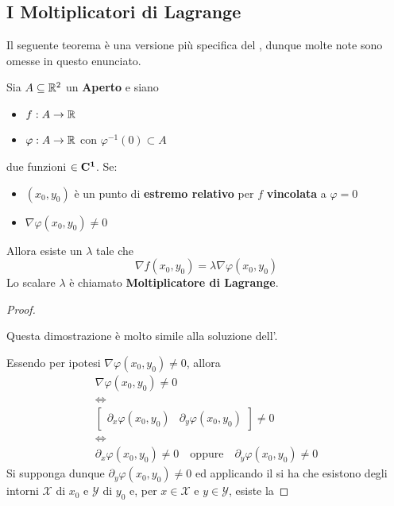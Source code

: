 \subsection{I Moltiplicatori di Lagrange}
Il seguente teorema è una versione più specifica del , dunque molte note sono omesse in questo enunciato.
\begin{theorem}[dei Moltiplicatori di Lagrange - $n=2$, $m=1$]
	\label{teo:molt_lagr_n2_m1}
	Sia $A \subseteq \mathbb{R}^2$ un \textbf{Aperto} e siano
	\begin{itemize}[noitemsep]
		\item $f: A \to \mathbb{R}$
		\item $\varphi: A \to \mathbb{R}$ con $\varphi^{-1}(0) \subset A$
	\end{itemize}
	due funzioni $\in \mathbf{C^{1}}$.
	Se:
	\begin{itemize}[noitemsep]
		\item $(x_0, y_0)$ è un punto di \textbf{estremo relativo} per $f$ \textbf{vincolata} a $\varphi = 0$
		\item $\nabla \varphi(x_0, y_0) \neq 0$
	\end{itemize}
	Allora esiste un $\lambda$ tale che
	\[\nabla f(x_0, y_0) = \lambda \nabla \varphi(x_0, y_0)\]
	Lo scalare $\lambda$ è chiamato \textbf{Moltiplicatore di Lagrange}.
	\begin{proof}~
		\begin{note}
			Questa dimostrazione è molto simile alla soluzione dell'.
		\end{note}
		Essendo per ipotesi $\nabla \varphi(x_0, y_0) \neq 0$, allora
		\[
			\begin{gathered}
				\nabla \varphi(x_0, y_0) \neq 0\\
				\iff\\
				\begin{bmatrix}
					\partial_x \varphi(x_0, y_0) & \partial_y \varphi(x_0, y_0)
				\end{bmatrix}
				\neq 0\\
				\iff\\
				\partial_x \varphi(x_0, y_0) \neq 0 \quad \text{oppure} \quad \partial_y \varphi(x_0, y_0) \neq 0
			\end{gathered}
		\]
		Si supponga dunque $\partial_y \varphi(x_0,y_0) \neq 0$ ed applicando il  si ha che esistono degli intorni $\mathcal{X}$ di $x_0$ e $\mathcal{Y}$ di $y_0$ e, per $x \in \mathcal{X}$ e $y \in \mathcal{Y}$, esiste la

\end{proof}
\end{theorem}
